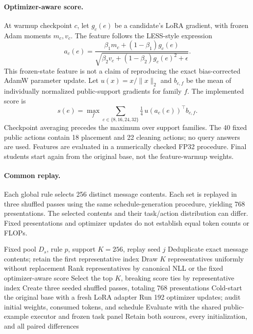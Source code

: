 \documentclass{article}
\begin{document}
\paragraph{Optimizer-aware score.} At warmup checkpoint $c$, let $g_c(e)$ be a candidate's LoRA gradient, with frozen Adam moments $m_c,v_c$. The feature follows the LESS-style expression
\begin{equation}
a_c(e)=\frac{\beta_1 m_c+(1-\beta_1)g_c(e)}{\sqrt{\beta_2 v_c+(1-\beta_2)g_c(e)^2+\epsilon}}.
\end{equation}
This frozen-state feature is not a claim of reproducing the exact bias-corrected AdamW parameter update. Let $u(x)=x/\|x\|_2$ and $b_{c,f}$ be the mean of individually normalized public-support gradients for family $f$. The implemented score is
\begin{equation}
s(e)=\max_f\sum_{c\in\{8,16,24,32\}}\tfrac14\,u(a_c(e))^\top b_{c,f}.
\end{equation}
Checkpoint averaging precedes the maximum over support families. The 40 fixed public actions contain 18 placement and 22 cleaning actions; no query answers are used. Features are evaluated in a numerically checked FP32 procedure. Final students start again from the original base, not the feature-warmup weights.

\paragraph{Common replay.} Each global rule selects 256 distinct message contents. Each set is replayed in three shuffled passes using the same schedule-generation procedure, yielding 768 presentations. The selected contents and their task/action distribution can differ. Fixed presentations and optimizer updates do not establish equal token counts or FLOPs.

\begin{algorithm}[t]
\caption{Global experience selection under the common training budget}
\label{alg:global}
\begin{algorithmic}[1]
\Require Fixed pool $D_s$, rule $p$, support $K=256$, replay seed $j$
\State Deduplicate exact message contents; retain the first representative index
  \State Draw $K$ representatives uniformly without replacement
\Else
  \State Rank representatives by canonical NLL or the fixed optimizer-aware score
  \State Select the top $K$, breaking score ties by representative index
\EndIf
\State Create three seeded shuffled passes, totaling 768 presentations
  \State Cold-start the original base with a fresh LoRA adapter
  \State Run 192 optimizer updates; audit initial weights, consumed tokens, and schedule
  \State Evaluate with the shared public-example executor and frozen task panel
\EndFor
\State Retain both sources, every initialization, and all paired differences
\end{algorithmic}
\end{algorithm}
\end{document}
